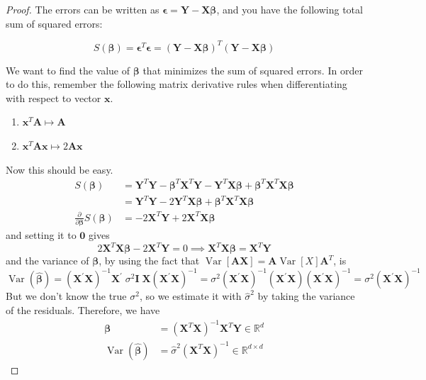 \documentclass{article}
\DeclareMathOperator{\Var}{Var}
\begin{document}
    \begin{proof}
      The errors can be written as $\boldsymbol{\epsilon} = \mathbf{Y} - \mathbf{X} \boldsymbol{\beta}$, and you have the following total sum of squared errors: 

      \[S(\boldsymbol{\beta}) = \boldsymbol{\epsilon}^T \boldsymbol{\epsilon} = (\mathbf{Y} - \mathbf{X} \boldsymbol{\beta})^T (\mathbf{Y} - \mathbf{X} \boldsymbol{\beta})\]

      We want to find the value of $\boldsymbol{\beta}$ that minimizes the sum of squared errors. In order to do this, remember the following matrix derivative rules when differentiating with respect to vector $\mathbf{x}$. 
      \begin{enumerate}
        \item $\mathbf{x}^T \mathbf{A} \mapsto \mathbf{A}$
        \item $\mathbf{x}^T \mathbf{A} \mathbf{x} \mapsto 2 \mathbf{A} \mathbf{x}$
      \end{enumerate}
      Now this should be easy. 
      \begin{align*}
          S(\boldsymbol{\beta}) & = \mathbf{Y}^T \mathbf{Y} - \boldsymbol{\beta}^T \mathbf{X}^T \mathbf{Y} - \mathbf{Y}^T \mathbf{X} \boldsymbol{\beta} + \boldsymbol{\beta}^T \mathbf{X}^T \mathbf{X} \boldsymbol{\beta} \\
          & = \mathbf{Y}^T \mathbf{Y} - 2 \mathbf{Y}^T \mathbf{X} \boldsymbol{\beta} + \boldsymbol{\beta}^T \mathbf{X}^T \mathbf{X} \boldsymbol{\beta} \\
          \frac{\partial}{\partial \boldsymbol{\beta}} S(\boldsymbol{\beta}) & = - 2 \mathbf{X}^T \mathbf{Y} + 2 \mathbf{X}^T \mathbf{X} \boldsymbol{\beta}
      \end{align*}
      and setting it to $\mathbf{0}$ gives 
      \[2 \mathbf{X}^T \mathbf{X} \boldsymbol{\beta} - 2 \mathbf{X}^T \mathbf{Y} = 0 \implies \mathbf{X}^T \mathbf{X} \boldsymbol{\beta} = \mathbf{X}^T \mathbf{Y}\]
      and the variance of $\boldsymbol{\beta}$, by using the fact that $\Var[\mathbf{A} \mathbf{X}] = \mathbf{A} \Var[X] \mathbf{A}^T$, is
      \[\Var(\hat{\boldsymbol{\beta}}) =
       (\mathbf{X}^{\prime} \mathbf{X})^{-1} \mathbf{X}^{\prime}
       \;\sigma^2 \mathbf{I} \; \mathbf{X}  (\mathbf{X}^{\prime} \mathbf{X})^{-1}
      = \sigma^2 (\mathbf{X}^{\prime} \mathbf{X})^{-1} (\mathbf{X}^{\prime}
       \mathbf{X})  (\mathbf{X}^{\prime} \mathbf{X})^{-1}
      = \sigma^2  (\mathbf{X}^{\prime} \mathbf{X})^{-1}\]
      But we don't know the true $\sigma^2$, so we estimate it with $\hat{\sigma}^2$ by taking the variance of the residuals. Therefore, we have 
      \begin{align*}
          \boldsymbol{\beta} & = (\mathbf{X}^T \mathbf{X})^{-1} \mathbf{X}^T \mathbf{Y} \in \mathbb{R}^d \\
          \Var(\hat{\boldsymbol{\beta}}) & = \hat{\sigma}^2 (\mathbf{X}^T \mathbf{X})^{-1} \in \mathbb{R}^{d \times d}
      \end{align*}
    \end{proof}
\end{document}
